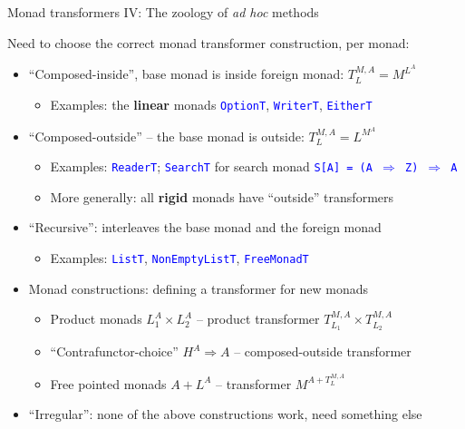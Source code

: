 \documentclass[english]{beamer}
\begin{document}
\begin{frame}{Monad transformers IV: The zoology of \emph{ad hoc} methods}

{\footnotesize{}\vspace{-0.2cm}}Need to choose the correct monad
transformer construction, per monad:
\begin{itemize}
\item ``Composed-inside'', base monad is inside foreign monad: $T_{L}^{M,A}=M^{L^{A}}$
\begin{itemize}
\item Examples: the \textbf{linear} monads \texttt{\textcolor{blue}{\footnotesize{}OptionT}},
\texttt{\textcolor{blue}{\footnotesize{}WriterT}}, \texttt{\textcolor{blue}{\footnotesize{}EitherT}} 
\end{itemize}
\item ``Composed-outside'' -- the base monad is outside: $T_{L}^{M,A}=L^{M^{A}}$
\begin{itemize}
\item Examples: \texttt{\textcolor{blue}{\footnotesize{}ReaderT}}; \texttt{\textcolor{blue}{\footnotesize{}SearchT}}
for search monad \texttt{\textcolor{blue}{\footnotesize{}S{[}A{]}
= (A $\Rightarrow$ Z) $\Rightarrow$ A}} 
\item More generally: all \textbf{rigid} monads have ``outside'' transformers
\end{itemize}
\item ``Recursive'': interleaves the base monad and the foreign monad
\begin{itemize}
\item Examples: \texttt{\textcolor{blue}{\footnotesize{}ListT}}, \texttt{\textcolor{blue}{\footnotesize{}NonEmptyListT}},
\texttt{\textcolor{blue}{\footnotesize{}FreeMonadT}} 
\end{itemize}
\item Monad constructions: defining a transformer for new monads
\begin{itemize}
\item Product monads $L_{1}^{A}\times L_{2}^{A}$ -- product transformer
$T_{L_{1}}^{M,A}\times T_{L_{2}}^{M,A}$
\item ``Contrafunctor-choice'' $H^{A}\Rightarrow A$ -- composed-outside
transformer
\item Free pointed monads $A+L^{A}$ -- transformer $M^{A+T_{L}^{M,A}}$
\end{itemize}
\item ``Irregular'': none of the above constructions work, need something
else
\begin{itemize}

\end{itemize}
\end{itemize}
\end{frame}
\end{document}

